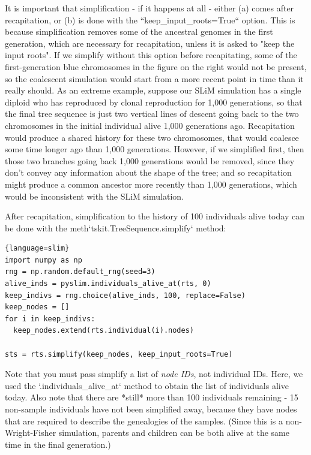 \documentclass[12pt]{article}
\begin{document}
It is important that simplification - if it happens at all -
either (a) comes after recapitation, or (b) is done with the
``keep\_input\_roots=True`` option.
This is because simplification removes some of the
ancestral genomes in the first generation,
which are necessary for recapitation,
unless it is asked to "keep the input roots".
If we simplify without this option before recapitating,
some of the first-generation blue chromosomes in the figure on the right
would not be present, so the coalescent simulation would start from a more recent point in time
than it really should.
As an extreme example, suppose our SLiM simulation has a single diploid who has reproduced
by clonal reproduction for 1,000 generations,
so that the final tree sequence is just two vertical lines of descent going back
to the two chromosomes in the initial individual alive 1,000 generations ago.
Recapitation would produce a shared history for these two chromosomes,
that would coalesce some time longer ago than 1,000 generations.
However, if we simplified first, then those two branches going back 1,000 generations would be removed,
since they don't convey any information about the shape of the tree;
and so recapitation might produce a common ancestor more recently than 1,000 generations,
which would be inconsistent with the SLiM simulation.

After recapitation,
simplification to the history of 100 individuals alive today
can be done with the {meth}`tskit.TreeSequence.simplify` method:
\begin{lstlisting}{language=slim}
import numpy as np
rng = np.random.default_rng(seed=3)
alive_inds = pyslim.individuals_alive_at(rts, 0)
keep_indivs = rng.choice(alive_inds, 100, replace=False)
keep_nodes = []
for i in keep_indivs:
  keep_nodes.extend(rts.individual(i).nodes)

sts = rts.simplify(keep_nodes, keep_input_roots=True)
\end{lstlisting}

Note that you must pass simplify a list of \textit{node IDs}, not individual IDs.
Here, we used the `.individuals\_alive\_at` method to obtain the list
of individuals alive today.
Also note that there are *still* more than 100 individuals remaining - 15 non-sample individuals
have not been simplified away,
because they have nodes that are required to describe the genealogies of the samples.
(Since this is a non-Wright-Fisher simulation,
parents and children can be both alive at the same time in the final generation.)
\end{document}
